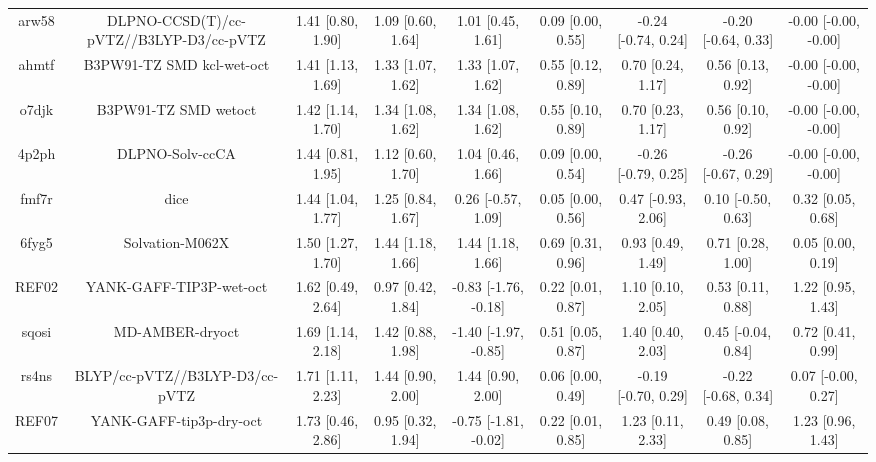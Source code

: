 \documentclass{article}
\begin{document}
\begin{center}
\begin{longtable}{|ccccccccc|}
 arw58 &            DLPNO-CCSD(T)/cc-pVTZ//B3LYP-D3/cc-pVTZ &  1.41 [0.80, 1.90] &  1.09 [0.60, 1.64] &     1.01 [0.45, 1.61] &  0.09 [0.00, 0.55] &  -0.24 [-0.74, 0.24] &  -0.20 [-0.64, 0.33] &  -0.00 [-0.00, -0.00] \\
 ahmtf &                          B3PW91-TZ SMD kcl-wet-oct &  1.41 [1.13, 1.69] &  1.33 [1.07, 1.62] &     1.33 [1.07, 1.62] &  0.55 [0.12, 0.89] &    0.70 [0.24, 1.17] &    0.56 [0.13, 0.92] &  -0.00 [-0.00, -0.00] \\
 o7djk &                               B3PW91-TZ SMD wetoct &  1.42 [1.14, 1.70] &  1.34 [1.08, 1.62] &     1.34 [1.08, 1.62] &  0.55 [0.10, 0.89] &    0.70 [0.23, 1.17] &    0.56 [0.10, 0.92] &  -0.00 [-0.00, -0.00] \\
 4p2ph &                                    DLPNO-Solv-ccCA &  1.44 [0.81, 1.95] &  1.12 [0.60, 1.70] &     1.04 [0.46, 1.66] &  0.09 [0.00, 0.54] &  -0.26 [-0.79, 0.25] &  -0.26 [-0.67, 0.29] &  -0.00 [-0.00, -0.00] \\
 fmf7r &                                               dice &  1.44 [1.04, 1.77] &  1.25 [0.84, 1.67] &    0.26 [-0.57, 1.09] &  0.05 [0.00, 0.56] &   0.47 [-0.93, 2.06] &   0.10 [-0.50, 0.63] &     0.32 [0.05, 0.68] \\
 6fyg5 &                                    Solvation-M062X &  1.50 [1.27, 1.70] &  1.44 [1.18, 1.66] &     1.44 [1.18, 1.66] &  0.69 [0.31, 0.96] &    0.93 [0.49, 1.49] &    0.71 [0.28, 1.00] &     0.05 [0.00, 0.19] \\
 REF02 &                            YANK-GAFF-TIP3P-wet-oct &  1.62 [0.49, 2.64] &  0.97 [0.42, 1.84] &  -0.83 [-1.76, -0.18] &  0.22 [0.01, 0.87] &    1.10 [0.10, 2.05] &    0.53 [0.11, 0.88] &     1.22 [0.95, 1.43] \\
 sqosi &                                    MD-AMBER-dryoct &  1.69 [1.14, 2.18] &  1.42 [0.88, 1.98] &  -1.40 [-1.97, -0.85] &  0.51 [0.05, 0.87] &    1.40 [0.40, 2.03] &   0.45 [-0.04, 0.84] &     0.72 [0.41, 0.99] \\
 rs4ns &                     BLYP/cc-pVTZ//B3LYP-D3/cc-pVTZ &  1.71 [1.11, 2.23] &  1.44 [0.90, 2.00] &     1.44 [0.90, 2.00] &  0.06 [0.00, 0.49] &  -0.19 [-0.70, 0.29] &  -0.22 [-0.68, 0.34] &    0.07 [-0.00, 0.27] \\
 REF07 &                            YANK-GAFF-tip3p-dry-oct &  1.73 [0.46, 2.86] &  0.95 [0.32, 1.94] &  -0.75 [-1.81, -0.02] &  0.22 [0.01, 0.85] &    1.23 [0.11, 2.33] &    0.49 [0.08, 0.85] &     1.23 [0.96, 1.43] \\

\end{longtable}
\end{center}
\end{document}
